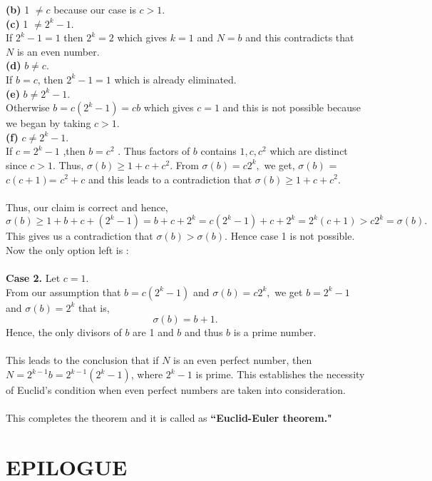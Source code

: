 \documentclass[a4paper,reqno,11pt]{book}
\theoremstyle{plain}%
\theoremstyle{definition}
\begin{document}
\textbf{(b)} 1 $\neq c$ because our case is $c > 1$.\\
\textbf{(c)} 1 $\neq 2^k-1.$\\
If $2^k-1 = 1 $ then $2^k =2$ which gives $k=1$ and $N=b$ and this contradicts that $N$ is an even number.\\
\textbf{(d)} $b \neq c$.\\
If $b=c$, then $2^k-1 = 1$ which is already eliminated.\\
\textbf{(e)} $b \neq 2^k-1$.\\
Otherwise $b = c(2^k-1) = cb$ which gives $c=1$ and this is not possible because we began by taking $c > 1.$\\
\textbf{(f)}  $c \neq 2^k-1.$\\
If $c = 2^k-1$ ,then $b=c^2$ . Thus factors of $b$ contains $1,c,c^2$ which are distinct since $c > 1$. Thus,
$\sigma(b) \geq 1+c+c^2$. From $\sigma(b)= c2^k,$ we get, $\sigma(b)$ = $c(c+1)$= $c^2 + c$ and this leads to a contradiction that $\sigma(b) \geq 1+c+c^2$.\\
\\
Thus, our claim is correct and hence,\\
$\sigma(b) \geq 1 + b + c + (2^k-1) = b + c + 2^k = c(2^k-1) + c + 2^k 
= 2^k(c+1)>c2^k = \sigma(b). $ \\
This gives us a contradiction that $\sigma(b) > \sigma(b).$ Hence case 1 is not possible. Now the only option left is :\\
\\
\textbf{Case 2.} Let $c=1$.\\
From our assumption that $b = c(2^k-1)$ and $\sigma(b) = c2^k,$ we get $b = 2^k-1 $ and $\sigma(b) = 2^k$ that is, \\
$$\sigma(b) = b + 1.$$
Hence, the only divisors of $b$ are 1 and $b$ and thus $b$ is a prime number.\\
\\
This leads to the conclusion that if $N$ is an even perfect number, then 
$N = 2^{k- 1} b = 2^{k-1} (2^k-1)$, where $2^k - 1$ is prime. This establishes the necessity of Euclid's condition when even perfect numbers are taken into consideration.\\
\\
This completes the theorem and it is called as \textbf{``Euclid-Euler theorem."}\\
\section{EPILOGUE}
\end{document}
